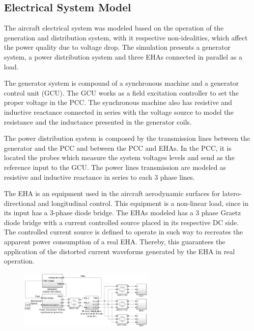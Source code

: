 \subsection{Electrical System Model}

The aircraft electrical system was modeled based on the operation of the generation and distribution system, with it respective non-idealities, which affect the power quality due to voltage drop. The simulation presents a generator system, a power distribution system and three EHAs connected in parallel as a load.

The generator system is compound of a synchronous machine and a generator control unit (GCU). The GCU works as a field excitation controller to set the proper voltage in the PCC. The synchronous machine also has resistive and inductive reactance connected in series with the voltage source to model the resistance and the inductance presented in the generator coils.

The power distribution system is composed by the transmission lines between the generator and the PCC and between the PCC and EHAs. In the PCC, it is located the probes which measure the system voltages levels and send as the reference input to the GCU. The power lines transmission are modeled as resistive and inductive reactance in series to each 3 phase lines.

The EHA is an equipment used in the aircraft aerodynamic surfaces for latero-directional and longitudinal control. This equipment is a non-linear load, since in its input has a 3-phase diode bridge. The EHAs modeled has a 3 phase Graetz diode bridge with a current controlled source placed in its respective DC side. The controlled current source is defined to operate in such way to recreates the apparent power consumption of a real EHA. Thereby, this guarantees the application of the distorted current waveforms generated by the EHA in real operation.

\begin{figure}[!tb] %
	\centering
	\includegraphics[width=0.6\textwidth]{Figures/simulacao_simulink.png}
	\caption{}
	\label{fig:simulacao_simulink.png}
\end{figure}


